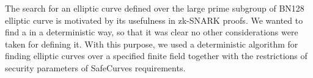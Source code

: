 

The search for an elliptic curve defined over the large prime subgroup of BN128 elliptic curve is motivated by its usefulness in zk-SNARK proofs. We wanted to find a in a deterministic way, so that it was clear no other considerations were taken for defining it. 
With this purpose, we used a deterministic algorithm for finding elliptic curves over a specified finite field together with the restrictions of security parameters of SafeCurves requirements. %
%
%
%
%
